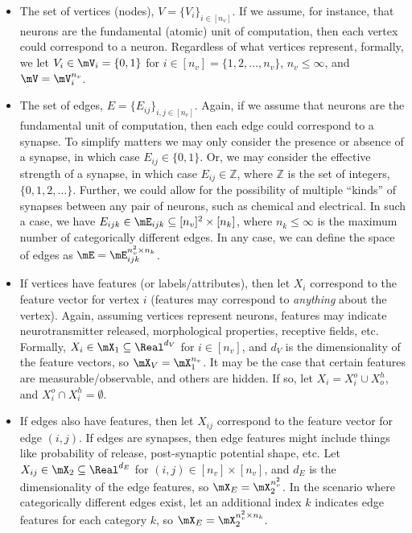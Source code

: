 \begin{itemize}
	\item The set of vertices (nodes), $V=\{V_i\}_{i\in[n_v]}$. If we assume, for instance, that neurons are the fundamental (atomic) unit of computation, then each vertex could correspond to a neuron. Regardless of what vertices represent, formally, we let $V_i \in \mV_i = \{0,1\}$ for $i \in [n_v]=\{1,2,\ldots,n_v\}$, $n_v \leq \infty$, and $\mV = \mV_i^{n_v}$.	%
	\item The set of edges, $E=\{E_{ij}\}_{i,j \in [n_v]}$. Again, if we assume that neurons are the fundamental unit of computation, then each edge could correspond to a synapse. To simplify matters we may only consider the presence or absence of a synapse, in which case $E_{ij} \in \{0,1\}$. Or, we may consider the effective strength of a synapse, in which case $E_{ij} \in \mathbb{Z}$, where $\mathbb{Z}$ is the set of integers, $\{0,1,2,\ldots\}$. Further, we could allow for the possibility of multiple ``kinds'' of synapses between any pair of neurons, such as chemical and electrical. In such a case, we have $E_{ijk} \in \mE_{ijk} \subseteq [n_v]^2 \times [n_k]$, where $n_k\leq \infty$ is the maximum number of categorically different edges. In any case, we can define the space of edges as $\mE=\mE_{ijk}^{n_v^2 \times n_k}$. 	%
	\item If vertices have features (or labels/attributes), then let $X_i$ correspond to the feature vector for vertex $i$ %
(features may correspond to \emph{anything} about the vertex). Again, assuming vertices represent neurons, features may indicate neurotransmitter released, morphological properties, receptive fields, etc. Formally, $X_i \in \mX_1 \subseteq \Real^{d_V}$ for $i \in [n_v]$, and $d_V$ is the dimensionality of the feature vectors, so $\mX_V = \mX_1^{n_v}$. It may be the case that certain features are measurable/observable, and others are hidden. If so, let $X_i = X^o_i \cup X^h_o$, and $X^o_i \cap X^h_i = \emptyset$. 
	\item If edges also have features, then let $X_{ij}$ correspond to the feature vector for edge $(i,j)$.  If edges are synapses, then edge features might include things like probability of release, post-synaptic potential shape, etc. Let $X_{ij} \in \mX_2 \subseteq \Real^{d_E}$ for $(i,j) \in [n_v] \times [n_v]$, and $d_E$ is the dimensionality of the edge features, so $\mX_E=\mX_2^{n_v^2}$. In the scenario where categorically different edges exist, let an additional index $k$ indicates edge features for each category $k$, so $\mX_E=\mX_2^{n_v^2 \times n_k}$.
\end{itemize}


